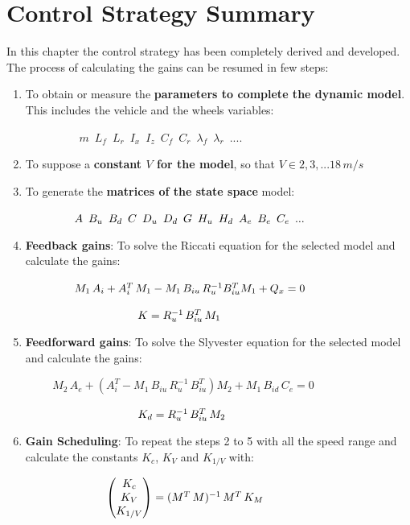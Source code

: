 \section{Control Strategy Summary}
In this chapter the control strategy has been completely derived and developed. The process of calculating the gains can be resumed in few steps:
\begin{enumerate}
\item To obtain or measure the \textbf{parameters to complete the dynamic model}. This includes the vehicle and the wheels variables: 

$\hspace{2cm} m \enspace L_{f} \enspace L_{r} \enspace I_{x} \enspace I_{z} \enspace C_{f} \enspace C_{r} \enspace \lambda_{f} \enspace \lambda_{r} \enspace ...$.

\item To suppose a \textbf{constant $V$ for the model}, so that $V \in {2,3,...18}\,m/s $

\item To generate the \textbf{matrices of the state space} model:

$\hspace{1.5cm} A \enspace B_{u} \enspace B_{d} \enspace C \enspace D_{u} \enspace D_{d} \enspace G \enspace H_{u} \enspace H_{d} \enspace A_{e} \enspace B_{e} \enspace C_{e} \enspace ...$

\item \textbf{Feedback gains}: To solve the Riccati equation for the selected model and calculate the gains: 

$\hspace{1.5cm} M_{1}\,A_{i} + A_{i}^{T}\,M_{1} - M_{1}\,B_{iu}\,R_{u}^{-1}B_{iu}^{T}M_{1} + Q_{x}=0$

$\hspace{3.5cm} K=R_{u}^{-1}\,B_{iu}^{T}\,M_{1}$

\item \textbf{Feedforward gains}: To solve the Slyvester equation for the selected model and calculate the gains: 

$\hspace{1cm}M_{2}\,A_{e}+(A_{i}^{T}-M_{1}\,B_{iu}\,R_{u}^{-1}\,B_{iu}^{T})M_{2}+M_{1}\,B_{id}\,C_{e}=0$

$\hspace{3.5cm} K_{d}=R_{u}^{-1}\,B_{iu}^{T}\,M_{2}$

\item \textbf{Gain Scheduling}: To repeat the steps 2 to 5 with all the speed range and calculate the constants $K_{c}$, $K_{V}$ and $K_{1/V}$  with:

$\hspace{2.5cm}\begin{pmatrix} K_{c} \\ K_{V} \\ K_{1/V} \end{pmatrix}=(M^{T}\,M)^{-1}\,M^{T}\,K_{M}$

\end{enumerate}
